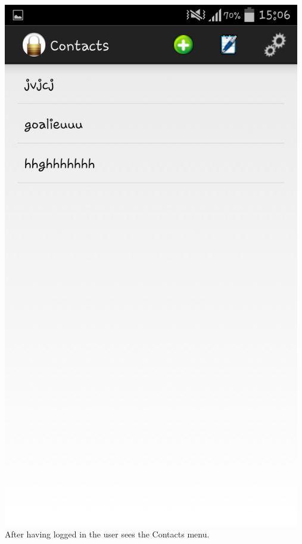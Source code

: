 \begin{center}
 \includegraphics[width=13cm]{screenshots/normal/3_ContactScreen.png}
 After having logged in the user sees the Contacts menu.
\end{center}
